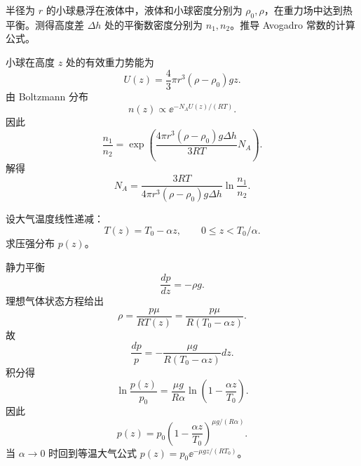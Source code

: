 \begin{question}
半径为 $r$ 的小球悬浮在液体中，液体和小球密度分别为 $\rho_0,\rho$，在重力场中达到热平衡。测得高度差 $\Delta h$ 处的平衡数密度分别为 $n_1,n_2$。推导 Avogadro 常数的计算公式。
\begin{solution}

小球在高度 $z$ 处的有效重力势能为
\[
 U(z)=\frac43\pi r^3(\rho-\rho_0)gz.
\]
由 Boltzmann 分布
\[
 n(z)\propto \ee^{-N_AU(z)/(RT)}.
\]
因此
\[
\frac{n_1}{n_2}=\exp\left(\frac{4\pi r^3(\rho-\rho_0)g\Delta h}{3RT}N_A\right).
\]
解得
\[
N_A=\frac{3RT}{4\pi r^3(\rho-\rho_0)g\Delta h}\ln\frac{n_1}{n_2}.
\]
\end{solution}
\end{question}

\begin{question}
设大气温度线性递减：
\[
T(z)=T_0-\alpha z,
\qquad 0\le z<T_0/\alpha.
\]
求压强分布 $p(z)$。
\begin{solution}

静力平衡
\[
\frac{dp}{dz}=-\rho g.
\]
理想气体状态方程给出
\[
\rho=\frac{p\mu}{RT(z)}=\frac{p\mu}{R(T_0-\alpha z)}.
\]
故
\[
\frac{dp}{p}=-\frac{\mu g}{R(T_0-\alpha z)}dz.
\]
积分得
\[
\ln\frac{p(z)}{p_0}=\frac{\mu g}{R\alpha}\ln\left(1-\frac{\alpha z}{T_0}\right).
\]
因此
\[
p(z)=p_0\left(1-\frac{\alpha z}{T_0}\right)^{\mu g/(R\alpha)}.
\]
当 $\alpha\to0$ 时回到等温大气公式 $p(z)=p_0\ee^{-\mu gz/(RT_0)}$。
\end{solution}
\end{question}
